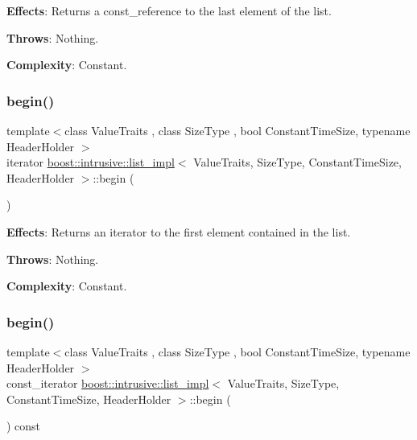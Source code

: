 {\bfseries Effects}\+: Returns a const\+\_\+reference to the last element of the list.

{\bfseries Throws}\+: Nothing.

{\bfseries Complexity}\+: Constant. \mbox{\label{classboost_1_1intrusive_1_1list__impl_acc6da960285b2ff0f37e1f373a767e19}} 
\subsubsection{\texorpdfstring{begin()}{begin()}\hspace{0.1cm}{\footnotesize\ttfamily [1/2]}}
{\footnotesize\ttfamily template$<$class Value\+Traits , class Size\+Type , bool Constant\+Time\+Size, typename Header\+Holder $>$ \\
iterator \hyperlink{classboost_1_1intrusive_1_1list__impl}{boost\+::intrusive\+::list\+\_\+impl}$<$ Value\+Traits, Size\+Type, Constant\+Time\+Size, Header\+Holder $>$\+::begin (\begin{DoxyParamCaption}{ }\end{DoxyParamCaption})\hspace{0.3cm}{\ttfamily [inline]}}

{\bfseries Effects}\+: Returns an iterator to the first element contained in the list.

{\bfseries Throws}\+: Nothing.

{\bfseries Complexity}\+: Constant. \mbox{\label{classboost_1_1intrusive_1_1list__impl_a049277a05485ff97f95ff4d778c5551d}} 
\subsubsection{\texorpdfstring{begin()}{begin()}\hspace{0.1cm}{\footnotesize\ttfamily [2/2]}}
{\footnotesize\ttfamily template$<$class Value\+Traits , class Size\+Type , bool Constant\+Time\+Size, typename Header\+Holder $>$ \\
const\+\_\+iterator \hyperlink{classboost_1_1intrusive_1_1list__impl}{boost\+::intrusive\+::list\+\_\+impl}$<$ Value\+Traits, Size\+Type, Constant\+Time\+Size, Header\+Holder $>$\+::begin (\begin{DoxyParamCaption}{ }\end{DoxyParamCaption}) const\hspace{0.3cm}{\ttfamily [inline]}}

